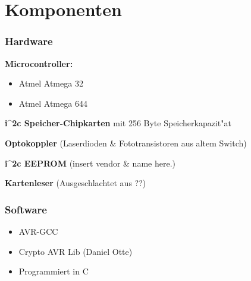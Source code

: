 %
%

\section{Komponenten}
\begin{frame}
	\frametitle{Hardware}
	\textbf{Microcontroller:}
	\begin{itemize}
		\item Atmel Atmega 32
		\item Atmel Atmega 644
	\end{itemize}
	\par
	\textbf{i^2c Speicher-Chipkarten} mit 256 Byte Speicherkapazit"at
	\par
	\textbf{Optokoppler} (Laserdioden \& Fototransistoren aus altem Switch)
	\par
	\textbf{i^2c EEPROM} (insert vendor \& name here.)
	\par
	\textbf{Kartenleser} (Ausgeschlachtet aus ??)
\end{frame}

\begin{frame}
	\frametitle{Software}
	\begin{itemize}
		\item AVR-GCC
		\item Crypto AVR Lib (Daniel Otte)
		\item Programmiert in C
	\end{itemize}
\end{frame}
